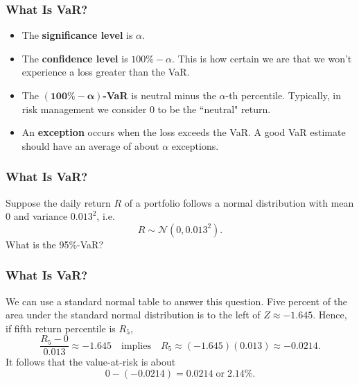 \documentclass{beamer}
\begin{document}
\begin{frame}
\frametitle{What Is VaR?}

\begin{itemize}
\item  The \textbf{significance level} is $\alpha$.
\item The \textbf{confidence level} is $100\% - \alpha$. This is how certain we are that we won't experience a loss greater than the VaR.
\item The $\boldsymbol{(100\% - \alpha)}$\textbf{-VaR} is neutral minus the $\alpha$-th percentile. Typically, in risk management we consider 0 to be the ``neutral"  return.
\item An \textbf{exception} occurs when the loss exceeds the VaR.  A good VaR estimate should have an average of about $\alpha$ exceptions.
\end{itemize}

\end{frame}

\begin{frame}
\frametitle{What Is VaR?}
\begin{example}
Suppose the daily return $R$ of a portfolio follows a normal distribution with mean 0 and variance $0.013^2$, i.e. 
$$R\sim{\mathcal{N}(0,0.013^2)}.$$ 
What is the 95\%-VaR?
\end{example}
\end{frame}

\begin{frame}
\frametitle{What Is VaR?}

\begin{center}


\end{center}

\begin{solution}
We can use a standard normal table to answer this question.  Five percent of the area under the standard normal distribution is to the left of  $Z\approx-1.645$. Hence, if fifth return percentile is $R_5$,
$$
\frac{R_5 - 0}{0.013} \approx -1.645\quad\text{implies}\quad R_5 \approx (-1.645)(0.013) \approx -0.0214.
$$
It follows that the value-at-risk is about
$$
0 - ( -0.0214) = 0.0214\;\text{or}\; 2.14\%.
$$
\end{solution}

\end{frame}
\end{document}

